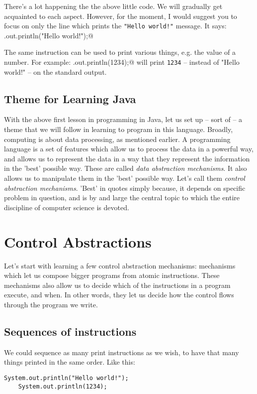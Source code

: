 \documentclass[12pt,a4paper]{article}
\begin{document}
There's a lot happening the the above little code. We will gradually get acquainted to each aspect. However, for the moment, I would suggest you to focus on only the line which prints the \texttt{"Hello world!"} message. It says:
    \lstinline@System.out.println("Hello world!");@

The same instruction can be used to print various things, e.g. the value of a number. For example:
    \lstinline@System.out.println(1234);@ will print \texttt{1234} -- instead of "Hello world!" -- on the standard output.

\begin{framed}
\section*{Theme for Learning Java}
With the above first lesson in programming in Java, let us set up -- sort of -- a theme that we will follow in learning to program in this language. Broadly, computing is about data processing, as mentioned earlier. A programming language is a set of features which allow us to process the data in a powerful way, and allows us to represent the data in a way that they represent the information in the 'best' possible way. These are called \emph{data abstraction mechanisms}. It also allows us to manipulate them in the 'best' possible way. Let's call them \emph{control abstraction mechanisms}. 'Best' in quotes simply because, it depends on specific problem in question, and is by and large the central topic to which the entire discipline of computer science is devoted. 
\end{framed}

\section{Control Abstractions}
Let's start with learning a few control abstraction mechanisms: mechanisms which let us compose bigger programs from atomic instructions. These mechanisms also allow us to decide which of the instructions in a program execute, and when. In other words, they let us decide how the control flows through the program we write.

\subsection{Sequences of instructions}
We could sequence as many print instructions as we wish, to have that many things printed in the same order. Like this:
\begin{lstlisting}[frame=single]
    System.out.println("Hello world!");
    System.out.println(1234);
\end{lstlisting}
\end{document}
